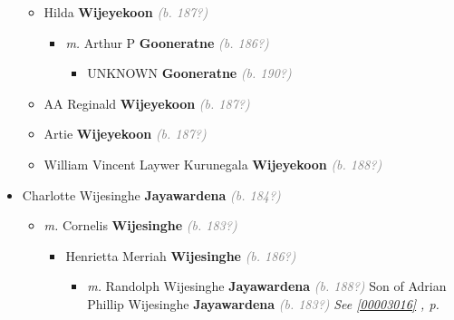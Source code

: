 \documentclass[10pt, openany]{book}
\begin{document}
\begin{itemize}
{\begin{itemize}
{\begin{itemize}
{\begin{itemize}
{\begin{itemize}
\item{Allan  \textbf{Wijeyekoon} \textcolor{gray}{\textit{(b. 190?)}}
 }
\end{itemize}}
\end{itemize}
  }
\item{Hilda  \textbf{Wijeyekoon} \textcolor{gray}{\textit{(b. 187?)}}
\begin{itemize}
\item{\textit{m.} Arthur P \textbf{Gooneratne} \textcolor{gray}{\textit{(b. 186?)}}   \label{couple:00003203:00003204} \begin{itemize}
\item{UNKNOWN \textbf{Gooneratne} \textcolor{gray}{\textit{(b. 190?)}}
 }
\end{itemize}}
\end{itemize}
 }
\item{AA Reginald  \textbf{Wijeyekoon} \textcolor{gray}{\textit{(b. 187?)}}
  }
\item{Artie  \textbf{Wijeyekoon} \textcolor{gray}{\textit{(b. 187?)}}
 }
\item{William Vincent  Laywer Kurunegala \textbf{Wijeyekoon} \textcolor{gray}{\textit{(b. 188?)}}
    }
\end{itemize}}
\end{itemize}
    }
\item{Charlotte Wijesinghe \textbf{Jayawardena} \textcolor{gray}{\textit{(b. 184?)}}
\begin{itemize}
\item{\textit{m.} Cornelis \textbf{Wijesinghe} \textcolor{gray}{\textit{(b. 183?)}}   \label{couple:00003425:00003426} \begin{itemize}
\item{Henrietta Merriah \textbf{Wijesinghe} \textcolor{gray}{\textit{(b. 186?)}}
\begin{itemize}
\item{\textit{m.} Randolph Wijesinghe \textbf{Jayawardena} \textcolor{gray}{\textit{(b. 188?)}} Son of  Adrian Phillip Wijesinghe \textbf{Jayawardena} \textcolor{gray}{\textit{(b. 183?)}} \textcolor{slteal}{\textit{See  \autoref{00003016} \textit{, p. \pageref{00003016} }}}   \label{couple:00003030:00003031} \begin{itemize}

\end{itemize}}
\end{itemize}}
\end{itemize}}
\end{itemize}}
\end{itemize}
\end{document}
